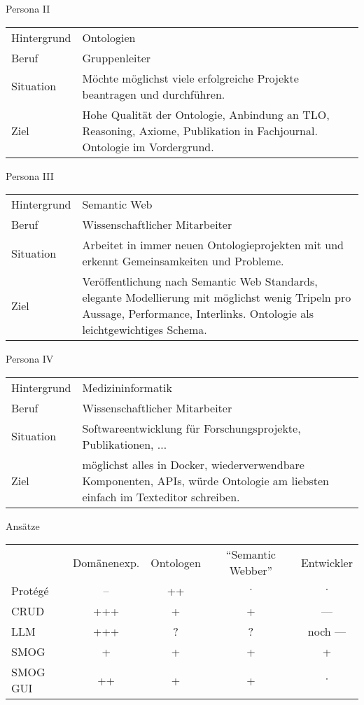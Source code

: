 \documentclass[14pt,aspectratio=1610]{beamer}
\begin{document}
\begin{frame}[fragile]{Persona II}
\begin{tabulary}{\textwidth}{lL}
Hintergrund		&Ontologien\\
Beruf					&Gruppenleiter\\
Situation			&Möchte möglichst viele erfolgreiche Projekte beantragen und durchführen.\\
Ziel					&Hohe Qualität der Ontologie, Anbindung an TLO, Reasoning, Axiome, Publikation in Fachjournal. Ontologie im Vordergrund.\\
\end{tabulary}
\end{frame}

\begin{frame}[fragile]{Persona III}
\begin{tabulary}{\textwidth}{lL}
Hintergrund		&Semantic Web\\
Beruf					&Wissenschaftlicher Mitarbeiter\\
Situation			&Arbeitet in immer neuen Ontologieprojekten mit und erkennt Gemeinsamkeiten und Probleme.\\
Ziel					&Veröffentlichung nach Semantic Web Standards, elegante Modellierung mit möglichst wenig Tripeln pro Aussage, Performance, Interlinks. Ontologie als leichtgewichtiges Schema.\\
\end{tabulary}
\end{frame}

\begin{frame}[fragile]{Persona IV}
\begin{tabulary}{\textwidth}{lL}
Hintergrund		&Medizininformatik\\
Beruf					&Wissenschaftlicher Mitarbeiter\\
Situation			&Softwareentwicklung für Forschungsprojekte, Publikationen, $\ldots$\\
Ziel					&möglichst alles in Docker, wiederverwendbare Komponenten, APIs, würde Ontologie am liebsten einfach im Texteditor schreiben.\\
\end{tabulary}
\end{frame}

\begin{frame}[fragile]{Ansätze}
\small
\begin{tabular}{lcccc}
											&Domänenexp.	&Ontologen	&\enquote{Semantic Webber}	&Entwickler\\
Protégé								&--								&++				&$\cdot{}$									&$\cdot$\\
CRUD									&+++							&+				&+													&---\\
LLM										&+++							&?				&?													&noch ---\\
SMOG									&+								&+				&+													&+\\
\midrule
SMOG GUI							&++								&+				&+													&$\cdot$\\
\bottomrule
\end{tabular}
\end{frame}
\end{document}
